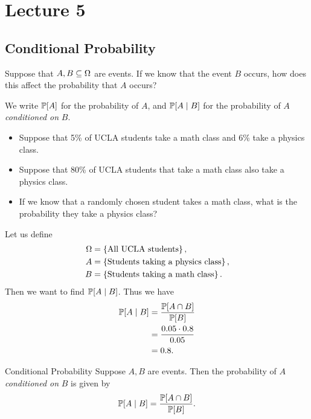 \documentclass[class=article, crop=false]{standalone}
\begin{document}
  \section{Lecture 5}
  \subsection{Conditional Probability}
  Suppose that $A, B\sse \Omega$ are events. If we know that the event $B$ occurs, how does this affect the probability that $A$ occurs? \par
  We write $\P[A]$ for the probability of $A$, and $\P[A\mid B]$ for the probability of $A$ \emph{conditioned on} $B$.
  \begin{example}{}
    \begin{itemize}
      \item Suppose that 5\% of UCLA students take a math class and 6\% take a physics class.
      \item Suppose that 80\% of UCLA students that take a math class also take a physics class.
      \item If we know that a randomly chosen student takes a math class, what is the probability they take a physics class?
    \end{itemize}
    Let us define 
    \begin{align*}
      \Omega &= \set{\text{All UCLA students}}, \\
      A &= \set{\text{Students taking a physics class}}, \\
      B &= \set{\text{Students taking a math class}}.
    \end{align*}
    Then we want to find $\P[A\mid B]$. Thus we have
    \begin{align*}
      \P[A\mid B] &= \frac{\P[A\cap B]}{\P[B]} \\
                  &= \frac{0.05\cdot 0.8}{0.05} \\
                  &= 0.8.
    \end{align*}
  \end{example}
  \begin{definition}{Conditional Probability}
    Suppose $A, B$ are events. Then the probability of $A$ \emph{conditioned on} $B$ is given by
    \[
      \P[A\mid B] = \frac{\P[A\cap B]}{\P[B]}.
    \]
  \end{definition}
\end{document}
